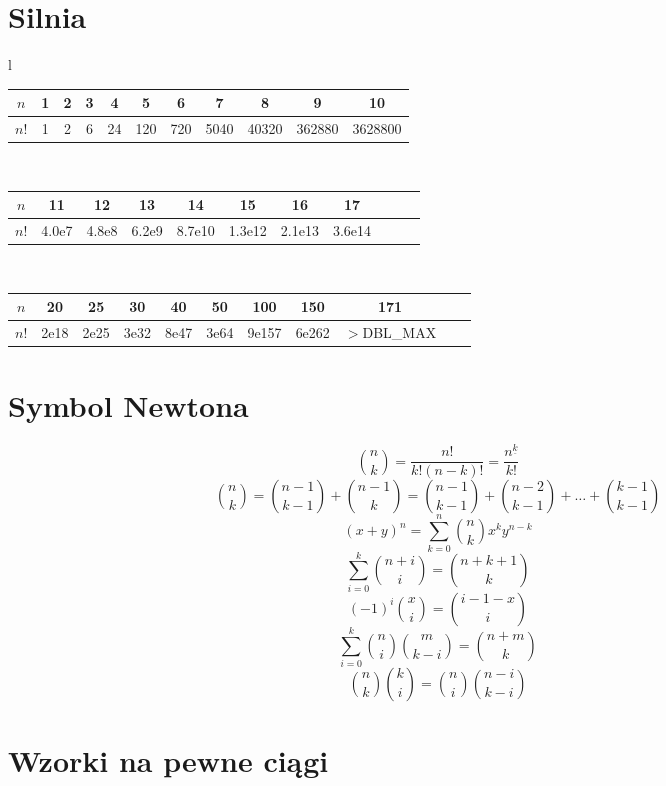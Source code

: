 \section{Silnia}
		\begin{center}
			\begin{tabular}{l}
				\begin{tabular}{c|c@{\ }c@{\ }c@{\ }c@{\ }c@{\ }c@{\ }c@{\ }c@{\ }c@{\ }c}
					$n$  & 1 & 2 & 3 & 4  & 5   & 6   & 7    & 8     & 9      & 10\\
					\hline
					$n!$ & 1 & 2 & 6 & 24 & 120 & 720 & 5040 & 40320 & 362880 & 3628800\\
				\end{tabular}\\
					\begin{tabular}{c|c@{\ }c@{\ }c@{\ }c@{\ }c@{\ }c@{\ }c@{\ }c@{\ }c@{\ }c}
					$n$  & 11    & 12    & 13    & 14     & 15     & 16     & 17\\
					\hline
					$n!$ & 4.0e7 & 4.8e8 & 6.2e9 & 8.7e10 & 1.3e12 & 2.1e13 & 3.6e14\\
				\end{tabular}\\
				\begin{tabular}{c|c@{\ }c@{\ }c@{\ }c@{\ }c@{\ }c@{\ }c@{\ }c@{\ }c@{\ }c}
					$n$  & 20   & 25   & 30   & 40   & 50   & 100   & 150   & 171\\
					\hline
					$n!$ & 2e18 & 2e25 & 3e32 & 8e47 & 3e64 & 9e157 & 6e262 & \scriptsize{$>$DBL\_MAX}\\
				\end{tabular}
			\end{tabular}
		\end{center}

\section{Symbol Newtona}
		$$ \binom{n}{k}=\dfrac{n!}{k!\left(n-k\right)!}=\dfrac{n^{\underline{k}}}{k!}$$
		$$ \binom{n}{k}=\binom{n-1}{k-1}+\binom{n-1}{k}=\binom{n-1}{k-1}+\binom{n-2}{k-1}+\dots+\binom{k-1}{k-1}$$
		$$ (x+y)^n=\sum_{k=0}^n \binom{n}{k} x^k y^{n-k} $$
		$$ \sum_{i=0}^k \binom{n+i}{i} = \binom{n+k+1}{k} $$
		$$ \left(-1\right)^i \binom{x}{i} = \binom{i - 1 - x}{i} $$
		$$ \sum_{i=0}^k \binom{n}{i} \binom{m}{k - i} = \binom{n + m}{k} $$
		$$ \binom{n}{k} \binom{k}{i} = \binom{n}{i} \binom{n - i}{k - i} $$


\section{Wzorki na pewne ciągi}
